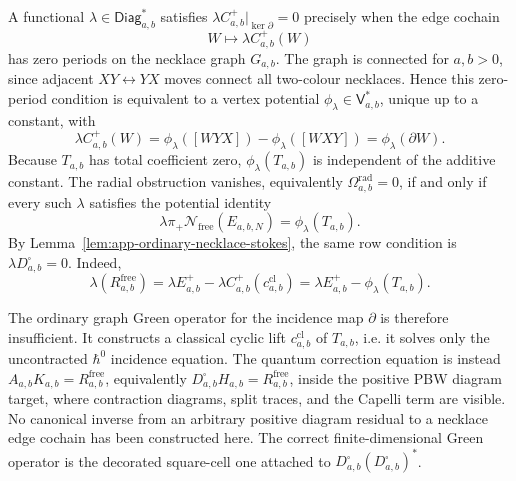\begin{rmk}
\label{rmk:app-decorated-hodge-potential-form}
  A functional \(\lambda\in\mathsf{Diag}_{a,b}^{*}\) satisfies
  \(\lambda C^+_{a,b}|_{\ker\partial}=0\) precisely when the edge cochain
  \[
    W\longmapsto \lambda C^+_{a,b}(W)
  \]
  has zero periods on the necklace graph \(G_{a,b}\).  The graph is
  connected for \(a,b>0\), since adjacent \(XY\leftrightarrow YX\)
  moves connect all two-colour necklaces.  Hence this zero-period
  condition is equivalent to a vertex potential
  \(\phi_\lambda\in\mathsf V_{a,b}^{*}\), unique up to a constant, with
  \[
    \lambda C^+_{a,b}(W)
    =
    \phi_\lambda([WYX])-\phi_\lambda([WXY])
    =
    \phi_\lambda(\partial W).
  \]
  Because \(T_{a,b}\) has total coefficient zero, \(\phi_\lambda(T_{a,b})\)
  is independent of the additive constant.  The radial obstruction
  vanishes, equivalently \(\Omega^{\mathrm{rad}}_{a,b}=0\), if and only
  if every such \(\lambda\) satisfies the potential identity
  \[
    \lambda\pi_+\mathcal N_{\mathrm{free}}(E_{a,b,N})
    =
    \phi_\lambda(T_{a,b}).
  \]
  By Lemma~\ref{lem:app-ordinary-necklace-stokes}, the same row condition
  is \(\lambda D^\square_{a,b}=0\).
  Indeed,
  \[
    \lambda(R^{\mathrm{free}}_{a,b})
    =
    \lambda E^+_{a,b}
    -\lambda C^+_{a,b}(c^{\mathrm{cl}}_{a,b})
    =
    \lambda E^+_{a,b}
    -\phi_\lambda(T_{a,b}).
  \]

  The ordinary graph Green operator for the incidence map
  \(\partial\) is therefore insufficient.  It constructs a classical
  cyclic lift \(c^{\mathrm{cl}}_{a,b}\) of \(T_{a,b}\), i.e. it solves
  only the uncontracted \(\hbar^0\) incidence equation.  The quantum
  correction equation is instead
  \(A_{a,b}K_{a,b}=R^{\mathrm{free}}_{a,b}\), equivalently
  \(D^\square_{a,b}H_{a,b}=R^{\mathrm{free}}_{a,b}\), inside the positive
  PBW diagram target, where contraction diagrams, split traces, and the
  Capelli term are visible.  No canonical inverse from an arbitrary
  positive diagram residual to a necklace edge cochain has been
  constructed here.  The correct finite-dimensional Green operator is
  the decorated square-cell one attached to
  \(D^\square_{a,b}(D^\square_{a,b})^{*}\).
\end{rmk}

